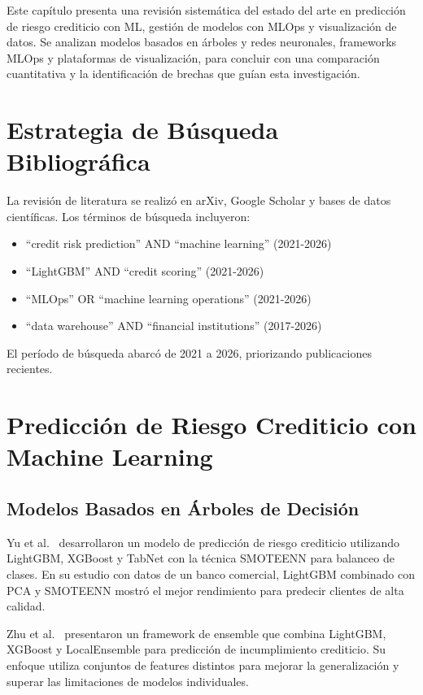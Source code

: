 Este capítulo presenta una revisión sistemática del estado del arte en predicción de riesgo crediticio con ML, gestión de modelos con MLOps y visualización de datos. Se analizan modelos basados en árboles y redes neuronales, frameworks MLOps y plataformas de visualización, para concluir con una comparación cuantitativa y la identificación de brechas que guían esta investigación.

\section{Estrategia de Búsqueda Bibliográfica}

La revisión de literatura se realizó en arXiv, Google Scholar y bases de
datos científicas. Los términos de búsqueda incluyeron:

\begin{itemize}
    \item ``credit risk prediction'' AND ``machine learning'' (2021-2026)
    \item ``LightGBM'' AND ``credit scoring'' (2021-2026)
    \item ``MLOps'' OR ``machine learning operations'' (2021-2026)
    \item ``data warehouse'' AND ``financial institutions'' (2017-2026)
\end{itemize}

El período de búsqueda abarcó de 2021 a 2026, priorizando publicaciones
recientes.

\section{Predicción de Riesgo Crediticio con Machine Learning}

\subsection{Modelos Basados en Árboles de Decisión}

Yu et al.~\cite{yu2024advanced} desarrollaron un modelo de predicción de riesgo crediticio utilizando LightGBM, XGBoost y TabNet con la técnica SMOTEENN para balanceo de clases. En su estudio con datos de un banco comercial, LightGBM combinado con PCA y SMOTEENN mostró el mejor rendimiento para predecir clientes de alta calidad.

Zhu et al.~\cite{zhu2024ensemble} presentaron un framework de ensemble que combina LightGBM, XGBoost y LocalEnsemble para predicción de incumplimiento crediticio. Su enfoque utiliza conjuntos de features distintos para mejorar la generalización y superar las limitaciones de modelos individuales.

